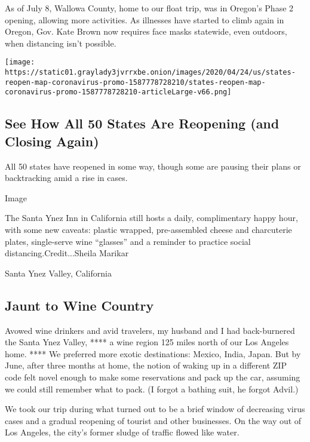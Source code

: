 As of July 8, Wallowa County, home to our float trip, was in Oregon's
Phase 2 opening, allowing more activities. As illnesses have started to
climb again in Oregon, Gov. Kate Brown now requires face masks
statewide, even outdoors, when distancing isn't possible.

\href{https://www.nytimes3xbfgragh.onion/interactive/2020/us/states-reopen-map-coronavirus.html}{}

\texttt{[image: https://static01.graylady3jvrrxbe.onion/images/2020/04/24/us/states-reopen-map-coronavirus-promo-1587778728210/states-reopen-map-coronavirus-promo-1587778728210-articleLarge-v66.png]}

\hypertarget{see-how-all-50-states-are-reopening-and-closing-again}{%
\subsection{See How All 50 States Are Reopening (and Closing
Again)}\label{see-how-all-50-states-are-reopening-and-closing-again}}

All 50 states have reopened in some way, though some are pausing their
plans or backtracking amid a rise in cases.

Image

The Santa Ynez Inn in California still hosts a daily, complimentary
happy hour, with some new caveats: plastic wrapped, pre-assembled cheese
and charcuterie plates, single-serve wine ``glasses'' and a reminder to
practice social distancing.Credit...Sheila Marikar

Santa Ynez Valley, California

\hypertarget{jaunt-to-wine-country}{%
\subsection{Jaunt to Wine Country}\label{jaunt-to-wine-country}}

Avowed wine drinkers and avid travelers, my husband and I had
back-burnered the Santa Ynez Valley, **** a wine region 125 miles north
of our Los Angeles home. **** We preferred more exotic destinations:
Mexico, India, Japan. But by June, after three months at home, the
notion of waking up in a different ZIP code felt novel enough to make
some reservations and pack up the car, assuming we could still remember
what to pack. (I forgot a bathing suit, he forgot Advil.)

We took our trip during what turned out to be a brief window of
decreasing virus cases and a gradual reopening of tourist and other
businesses. On the way out of Los Angeles, the city's former sludge of
traffic flowed like water.

